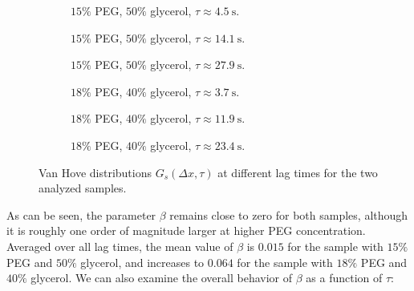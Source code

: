 \begin{figure}[!htbp]
    \centering
    \begin{subfigure}[t]{0.32\textwidth}
        \centering
        
        \caption{$15\%$ PEG, $50\%$ glycerol, $\tau \approx 4.5~\mathrm{s}$.}
    \end{subfigure}
    \hfill
    \begin{subfigure}[t]{0.32\textwidth}
        \centering
        
        \caption{$15\%$ PEG, $50\%$ glycerol, $\tau \approx 14.1~\mathrm{s}$.}
    \end{subfigure}
    \hfill
    \begin{subfigure}[t]{0.32\textwidth}
        \centering
        
        \caption{$15\%$ PEG, $50\%$ glycerol, $\tau \approx 27.9~\mathrm{s}$.}
    \end{subfigure}

    \vspace{0.5em}

    \begin{subfigure}[t]{0.32\textwidth}
        \centering
        
        \caption{$18\%$ PEG, $40\%$ glycerol, $\tau \approx 3.7~\mathrm{s}$.}
    \end{subfigure}
    \hfill
    \begin{subfigure}[t]{0.32\textwidth}
        \centering
        
        \caption{$18\%$ PEG, $40\%$ glycerol, $\tau \approx 11.9~\mathrm{s}$.}
    \end{subfigure}
    \hfill
    \begin{subfigure}[t]{0.32\textwidth}
        \centering
        
        \caption{$18\%$ PEG, $40\%$ glycerol, $\tau \approx 23.4~\mathrm{s}$.}
    \end{subfigure}

    \caption{Van Hove distributions $G_s(\Delta x,\tau)$ at different lag times for the two analyzed samples.}
    \label{fig:van_hove_distributions_lags}
\end{figure}

As can be seen, the parameter $\beta$ remains close to zero for both samples, although it is roughly one order of magnitude larger at higher PEG concentration. Averaged over all lag times, the mean value of $\beta$ is $0.015$ for the sample with $15\%$ PEG and $50\%$ glycerol, and increases to $0.064$ for the sample with $18\%$ PEG and $40\%$ glycerol. We can also examine the overall behavior of $\beta$ as a function of $\tau$:

